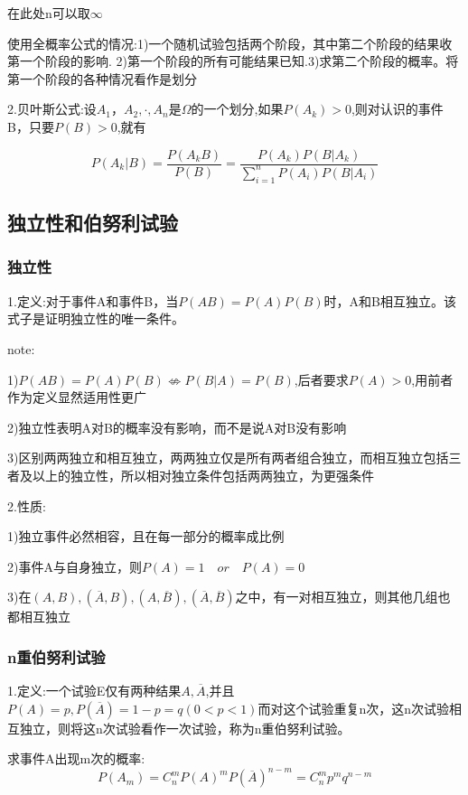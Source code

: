 \documentclass[11pt,twoside,a4paper]{ctexart}
\begin{document}
    在此处n可以取$\infty $

    使用全概率公式的情况:1)一个随机试验包括两个阶段，其中第二个阶段的结果收第一个阶段的影响. 2)第一个阶段的所有可能结果已知.3)求第二个阶段的概率。将第一个阶段的各种情况看作是划分

    2.贝叶斯公式:设$A_1 ， A_2 , \cdot , A_n $是$\varOmega $的一个划分,如果$P(A_k) > 0 $,则对认识的事件B，只要$P(B) > 0 $,就有

    \[P(A_k\vert B) = \frac{P(A_kB)}{P(B)} = \frac{P(A_k)P(B\vert A_k)}{\sum_{i=1}^n {P(A_i)P(B\vert A_i)  }} \]

    \subsection{独立性和伯努利试验}
    \subsubsection{独立性}
    1.定义:对于事件A和事件B，当$P(AB) = P(A)P(B) $时，A和B相互独立。该式子是证明独立性的唯一条件。

    note:
    \begin{minipage}[t]{0.9\linewidth}
        1)$P(AB) = P(A)P(B)  \nLeftrightarrow  P(B\vert A) = P(B) $,后者要求$P(A) > 0 $,用前者作为定义显然适用性更广

        2)独立性表明A对B的概率没有影响，而不是说A对B没有影响

        3)区别两两独立和相互独立，两两独立仅是所有两者组合独立，而相互独立包括三者及以上的独立性，所以相对独立条件包括两两独立，为更强条件

    \end{minipage}

    2.性质:
    \begin{minipage}[t]{0.9\linewidth}
        1)独立事件必然相容，且在每一部分的概率成比例

        2)事件A与自身独立，则$P(A) = 1 \quad or \quad P(A) = 0  $

        3)在$(A,B), (\overline{A},B),(A,\overline{B}),(\overline{A},\overline{B}) $之中，有一对相互独立，则其他几组也都相互独立

    \end{minipage}
    \subsubsection{n重伯努利试验}
    1.定义:一个试验E仅有两种结果$A,\overline{A} $,并且$P(A) = p,P(\overline{A}) = 1 - p = q (0 < p < 1) $而对这个试验重复n次，这n次试验相互独立，则将这n次试验看作一次试验，称为n重伯努利试验。
    
    求事件A出现m次的概率:
    \[P(A_m) = C_n^m P(A)^m P(\overline{A})^{n-m} = C_n^m p^m q^{n-m} \] 



    



    


    
\end{document}
